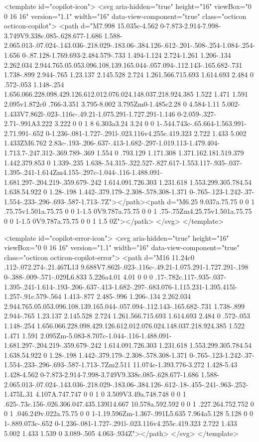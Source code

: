 {{<template id="copilot-icon">
  <svg aria-hidden="true" height="16" viewBox="0 0 16 16" version="1.1" width="16" data-view-component="true" class="octicon octicon-copilot">
    <path d="M7.998 15.035c-4.562 0-7.873-2.914-7.998-3.749V9.338c.085-.628.677-1.686 1.588-2.065.013-.07.024-.143.036-.218.029-.183.06-.384.126-.612-.201-.508-.254-1.084-.254-1.656 0-.87.128-1.769.693-2.484.579-.733 1.494-1.124 2.724-1.261 1.206-.134 2.262.034 2.944.765.05.053.096.108.139.165.044-.057.094-.112.143-.165.682-.731 1.738-.899 2.944-.765 1.23.137 2.145.528 2.724 1.261.566.715.693 1.614.693 2.484 0 .572-.053 1.148-.254 1.656.066.228.098.429.126.612.012.076.024.148.037.218.924.385 1.522 1.471 1.591 2.095v1.872c0 .766-3.351 3.795-8.002 3.795Zm0-1.485c2.28 0 4.584-1.11 5.002-1.433V7.862l-.023-.116c-.49.21-1.075.291-1.727.291-1.146 0-2.059-.327-2.71-.991A3.222 3.222 0 0 1 8 6.303a3.24 3.24 0 0 1-.544.743c-.65.664-1.563.991-2.71.991-.652 0-1.236-.081-1.727-.291l-.023.116v4.255c.419.323 2.722 1.433 5.002 1.433ZM6.762 2.83c-.193-.206-.637-.413-1.682-.297-1.019.113-1.479.404-1.713.7-.247.312-.369.789-.369 1.554 0 .793.129 1.171.308 1.371.162.181.519.379 1.442.379.853 0 1.339-.235 1.638-.54.315-.322.527-.827.617-1.553.117-.935-.037-1.395-.241-1.614Zm4.155-.297c-1.044-.116-1.488.091-1.681.297-.204.219-.359.679-.242 1.614.091.726.303 1.231.618 1.553.299.305.784.54 1.638.54.922 0 1.28-.198 1.442-.379.179-.2.308-.578.308-1.371 0-.765-.123-1.242-.37-1.554-.233-.296-.693-.587-1.713-.7Z"></path><path d="M6.25 9.037a.75.75 0 0 1 .75.75v1.501a.75.75 0 0 1-1.5 0V9.787a.75.75 0 0 1 .75-.75Zm4.25.75v1.501a.75.75 0 0 1-1.5 0V9.787a.75.75 0 0 1 1.5 0Z"></path>
</svg>
</template>

<template id="copilot-error-icon">
  <svg aria-hidden="true" height="16" viewBox="0 0 16 16" version="1.1" width="16" data-view-component="true" class="octicon octicon-copilot-error">
    <path d="M16 11.24c0 .112-.072.274-.21.467L13 9.688V7.862l-.023-.116c-.49.21-1.075.291-1.727.291-.198 0-.388-.009-.571-.029L6.833 5.226a4.01 4.01 0 0 0 .17-.782c.117-.935-.037-1.395-.241-1.614-.193-.206-.637-.413-1.682-.297-.683.076-1.115.231-1.395.415l-1.257-.91c.579-.564 1.413-.877 2.485-.996 1.206-.134 2.262.034 2.944.765.05.053.096.108.139.165.044-.057.094-.112.143-.165.682-.731 1.738-.899 2.944-.765 1.23.137 2.145.528 2.724 1.261.566.715.693 1.614.693 2.484 0 .572-.053 1.148-.254 1.656.066.228.098.429.126.612.012.076.024.148.037.218.924.385 1.522 1.471 1.591 2.095Zm-5.083-8.707c-1.044-.116-1.488.091-1.681.297-.204.219-.359.679-.242 1.614.091.726.303 1.231.618 1.553.299.305.784.54 1.638.54.922 0 1.28-.198 1.442-.379.179-.2.308-.578.308-1.371 0-.765-.123-1.242-.37-1.554-.233-.296-.693-.587-1.713-.7Zm2.511 11.074c-1.393.776-3.272 1.428-5.43 1.428-4.562 0-7.873-2.914-7.998-3.749V9.338c.085-.628.677-1.686 1.588-2.065.013-.07.024-.143.036-.218.029-.183.06-.384.126-.612-.18-.455-.241-.963-.252-1.475L.31 4.107A.747.747 0 0 1 0 3.509V3.49a.748.748 0 0 1 .625-.73c.156-.026.306.047.435.139l14.667 10.578a.592.592 0 0 1 .227.264.752.752 0 0 1 .046.249v.022a.75.75 0 0 1-1.19.596Zm-1.367-.991L5.635 7.964a5.128 5.128 0 0 1-.889.073c-.652 0-1.236-.081-1.727-.291l-.023.116v4.255c.419.323 2.722 1.433 5.002 1.433 1.539 0 3.089-.505 4.063-.934Z"></path>
</svg>
</template>

}}
